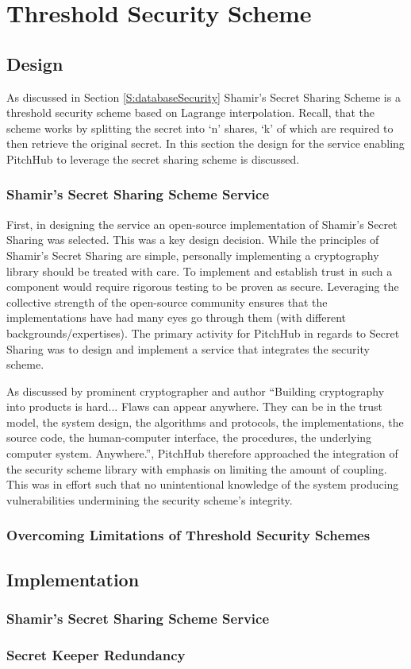 \chapter{Threshold Security Scheme}\label{C:threshholdSecurity}

\section{Design}
As discussed in Section \ref{S:databaseSecurity} Shamir's Secret Sharing Scheme is a threshold security scheme based on Lagrange interpolation. Recall, that the scheme works by splitting the secret into `n' shares, `k' of which are required to then retrieve the original secret. In this section the design for the service enabling PitchHub to leverage the secret sharing scheme is discussed.

\subsection{Shamir's Secret Sharing Scheme Service}
First, in designing the service an open-source implementation of Shamir's Secret Sharing was selected. This was a key design decision. While the principles of Shamir's Secret Sharing are simple, personally implementing a cryptography library should be treated with care. To implement and establish trust in such a component would require rigorous testing to be proven as secure. Leveraging the collective strength of the open-source community ensures that the implementations have had many eyes go through them (with different backgrounds/expertises). The primary activity for PitchHub in regards to Secret Sharing was to design and implement a service that integrates the security scheme.
\par
As discussed by prominent cryptographer and author \citeauthor{schneier1999cryptography} ``Building cryptography into products is hard... Flaws can appear anywhere. They can be in the trust model, the system design, the algorithms and protocols, the implementations, the source code, the human-computer interface, the procedures, the underlying computer system. Anywhere.''\cite{schneier1999cryptography}, PitchHub therefore approached the integration of the security scheme library with emphasis on limiting the amount of coupling. This was in effort such that no unintentional knowledge of the system producing vulnerabilities undermining the security scheme's integrity.

\subsection{Overcoming Limitations of Threshold Security Schemes}

\section{Implementation}

\subsection{Shamir's Secret Sharing Scheme Service}

\subsection{Secret Keeper Redundancy}